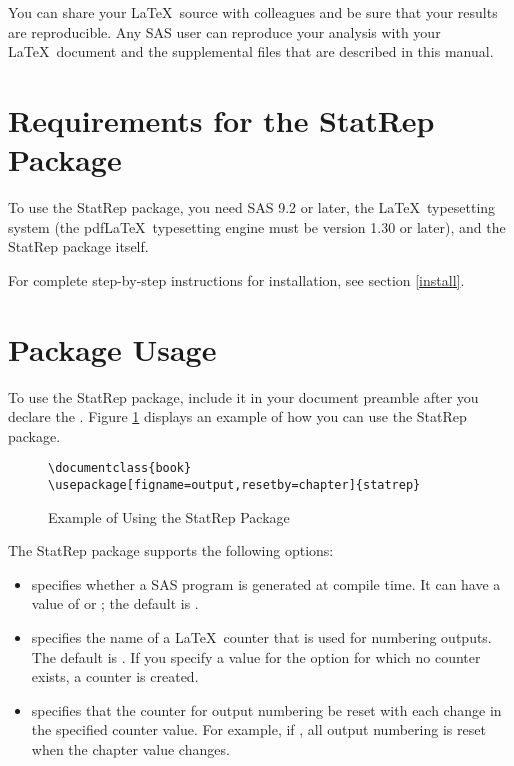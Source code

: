 \documentclass[article,oneside]{memoir}
\newcommand*{\StatRep}{\textsf{StatRep}\xspace}
\begin{document}
You can share your \LaTeX\ source with colleagues and be sure that your results
are reproducible. Any SAS user can reproduce your analysis with your \LaTeX\ document 
and the supplemental files that are described in this manual.

\section{Requirements for the \StatRep Package}
To use the \StatRep package, you need SAS 9.2 or later, 
the \LaTeX\ typesetting system 
(the  pdf\LaTeX\ typesetting engine must be version 1.30 or later), and the \StatRep package itself. 

For complete step-by-step instructions for installation, see section \ref{install}.
\section{Package Usage}
  To use the \StatRep package, include it in your document preamble after you
  declare the .   
  Figure \ref{fig:usage} displays an example of how you can use the \StatRep package.
 
\begin{figure}[H]
\begin{shaded}
\begin{verbatim} 
\documentclass{book} 
\usepackage[figname=output,resetby=chapter]{statrep} 
\end{verbatim}%
\end{shaded}
\caption{Example of Using the \StatRep Package}\label{fig:usage}
\end{figure}

 The \StatRep package supports the following options:
     \begin{itemize}
     \item {} specifies whether a SAS program 
     is generated at compile time. 
     It can have a value of  or ; the default is .
     
     \item {} specifies the name of a \LaTeX\ counter 
     that is used for numbering outputs.
     The default is . If you specify a value for the  
     option for which no counter exists, 
     a counter is created.  
     
     \item {} specifies that the counter for output numbering be reset with
     each change in the specified counter value. For example, if ,
     all output numbering is reset when the chapter value changes. 
     \end{itemize}
     
\end{document}
